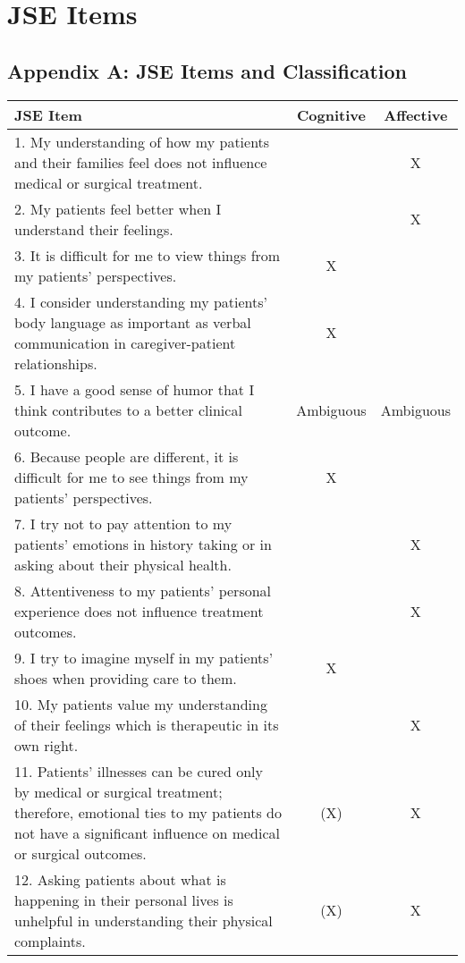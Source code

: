 
\chapter{JSE Items}
\section*{Appendix A: JSE Items and Classification}
\label{app:jse}

\begin{table}[htbp]
\centering
\begin{tabular}{p{11cm}cc}
\toprule
\textbf{JSE Item} & \textbf{Cognitive} & \textbf{Affective} \\
\midrule
1. My understanding of how my patients and their families feel does not influence medical or surgical treatment. &  & X \\
2. My patients feel better when I understand their feelings. &  & X \\
3. It is difficult for me to view things from my patients’ perspectives. & X & \\
4. I consider understanding my patients’ body language as important as verbal communication in caregiver-patient relationships. & X & \\
5. I have a good sense of humor that I think contributes to a better clinical outcome. & Ambiguous & Ambiguous \\
6. Because people are different, it is difficult for me to see things from my patients’ perspectives. & X & \\
7. I try not to pay attention to my patients’ emotions in history taking or in asking about their physical health. &  & X \\
8. Attentiveness to my patients’ personal experience does not influence treatment outcomes. &  & X \\
9. I try to imagine myself in my patients’ shoes when providing care to them. & X & \\
10. My patients value my understanding of their feelings which is therapeutic in its own right. &  & X \\
11. Patients’ illnesses can be cured only by medical or surgical treatment; therefore, emotional ties to my patients do not have a significant influence on medical or surgical outcomes. & (X) & X \\
12. Asking patients about what is happening in their personal lives is unhelpful in understanding their physical complaints. & (X) & X \\

\end{tabular}
\end{table}

